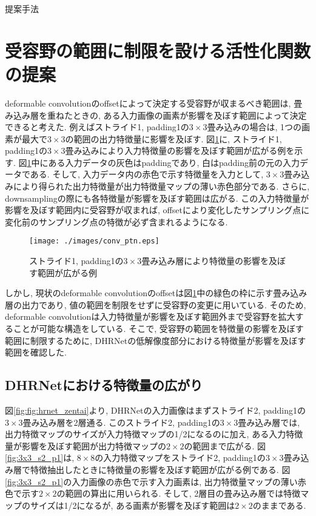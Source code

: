 \begin{chapter}{提案手法}
\section{受容野の範囲に制限を設ける活性化関数の提案}\label{sec:teian_ac_fn}
deformable convolutionのoffsetによって決定する受容野が収まるべき範囲は, 畳み込み層を重ねたときの, ある入力画像の画素が影響を及ぼす範囲によって決定できると考えた. 例えばストライド1, padding1の$3\times3$畳み込みの場合は, 1つの画素が最大で$3\times3$の範囲の出力特徴量に影響を及ぼす. 図\ref{fig:conv_ptn}に, ストライド1, padding1の$3\times3$畳み込みにより入力特徴量の影響を及ぼす範囲が広がる例を示す. 図\ref{fig:conv_ptn}中にある入力データの灰色はpaddingであり, 白はpadding前の元の入力データである. そして, 入力データ内の赤色で示す特徴量を入力として, $3\times3$畳み込みにより得られた出力特徴量が出力特徴量マップの薄い赤色部分である. さらに, downsamplingの際にも各特徴量が影響を及ぼす範囲は広がる. この入力特徴量が影響を及ぼす範囲内に受容野が収まれば, offsetにより変化したサンプリング点に変化前のサンプリング点の特徴が必ず含まれるようになる. \\
\begin{figure}[H]
  \centering
  \texttt{[image: ./images/conv\_ptn.eps]}
  \caption{ストライド1, padding1の$3\times3$畳み込み層により特徴量の影響を及ぼす範囲が広がる例}
  \label{fig:conv_ptn}
\end{figure}
しかし, 現状のdeformable convolutionのoffsetは図\ref{fig:conv_ptn}中の緑色の枠に示す畳み込み層の出力であり, 値の範囲を制限をせずに受容野の変更に用いている. そのため, deformable convolutionは入力特徴量が影響を及ぼす範囲外まで受容野を拡大することが可能な構造をしている. そこで, 受容野の範囲を特徴量の影響を及ぼす範囲に制限するために, DHRNetの低解像度部分における特徴量が影響を及ぼす範囲を確認した. 

\subsection{DHRNetにおける特徴量の広がり}\label{subsec:dhrnet_feature_map}
図\ref{fig:fig:hrnet_zentai}より, DHRNetの入力画像はまずストライド2, padding1の$3\times3$畳み込み層を2層通る. このストライド2, padding1の$3\times3$畳み込み層では, 出力特徴マップのサイズが入力特徴マップの1/2になるのに加え, ある入力特徴量が影響を及ぼす範囲が出力特徴マップの$2\times2$の範囲まで広がる. 図\ref{fig:3x3_s2_p1}は, $8\times8$の入力特徴マップをストライド2, padding1の$3\times3$畳み込み層で特徴抽出したときに特徴量の影響を及ぼす範囲が広がる例である. 図\ref{fig:3x3_s2_p1}の入力画像の赤色で示す入力画素は, 出力特徴量マップの薄い赤色で示す$2\times2$の範囲の算出に用いられる. そして, 2層目の畳み込み層では特徴マップのサイズは1/2になるが, ある画素が影響を及ぼす範囲は$2\times2$のままである. 


\end{chapter}
